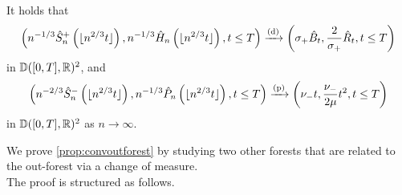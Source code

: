 \begin{proposition}\label{prop:convoutforest}
It holds that
\begin{align*}\left(n^{-1/3}\hat{S}^{+}_n\left(\lfloor n^{2/3}t\rfloor \right),n^{-1/3}\hat{H}_{n}\left(\lfloor n^{2/3}t\rfloor \right), t\leq T \right)
\xrightarrow[]{\mathrm{(d)}}\left(\sigma_+ \hat{B}_t, \frac{2}{\sigma_+} \hat{R}_t, t\leq T \right)\end{align*}
in ${\mathbb D}([0,T],{\mathbb R})^2$, and 
\begin{align*}\left( n^{-2/3}\hat{S}_n^-\left(\lfloor n^{2/3}t\rfloor \right), n^{-1/3}\hat{P}_n\left(\lfloor n^{2/3}t\rfloor \right), t\leq T \right)\xrightarrow[]{\mathrm{(p)}}\left(\nu_-t,  \frac{\nu_-}{2\mu} t^2, t\leq T \right)\end{align*}
in ${\mathbb D}([0,T],{\mathbb R})^2$ as $n\to \infty$. 
\end{proposition}
We prove \cref{prop:convoutforest} by studying two other forests that are related to the out-forest via a change of measure.  \\
The proof is structured as follows.
